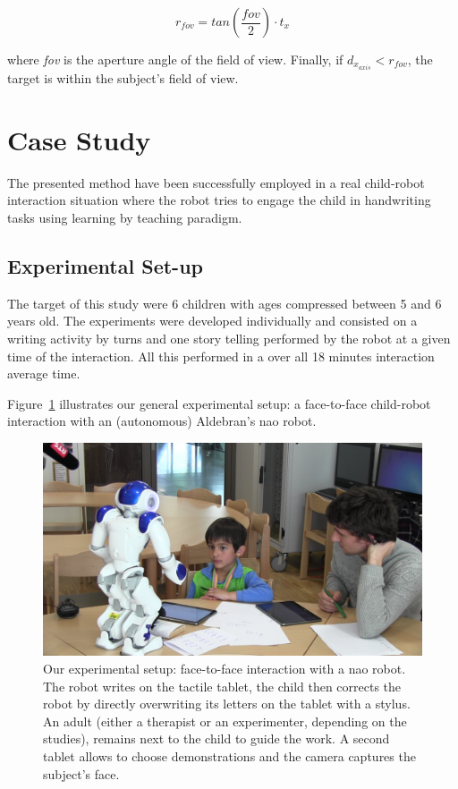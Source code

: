 \documentclass{sig-alternate}
\begin{document}
\begin{equation}
r_{fov} = tan\left(\frac{fov}{2}\right) \cdot t_x
\label{eq:fovtf}
\end{equation}

where \textit{fov} is the aperture angle of the field of view. Finally, if $
d_{x_{axis}}<r_{fov} $, the target is within the subject's field of view.


\section{Case Study}

The presented method have been successfully employed in a real child-robot
interaction situation where the robot tries to engage the child in handwriting
tasks using learning by teaching paradigm.

\subsection{Experimental Set-up}

The target of this study were 6 children with ages compressed between 5 and 6
years old. The experiments were developed individually and consisted on a
writing activity by turns and one story telling performed by the robot at a
given time of the interaction. All this performed in a over all 18 minutes
interaction average time.

Figure~\ref{fig:realSetup} illustrates our general experimental setup: a
face-to-face child-robot interaction with an (autonomous) Aldebran's {\sc nao}
robot.

\begin{figure}[h!]
    \centering
    \includegraphics[width=1\columnwidth]{realSetup}
    \caption{\small Our experimental setup: face-to-face interaction with a {\sc
            nao} robot.  The robot writes on the tactile tablet, the child then
            corrects the robot by directly overwriting its letters on the tablet
            with a stylus. An adult (either a therapist or an experimenter,
            depending on the studies), remains next to the child to guide the work. 
            A second tablet allows to choose demonstrations and the camera captures the subject's face.}
    \label{fig:realSetup}
\end{figure}
\end{document}

